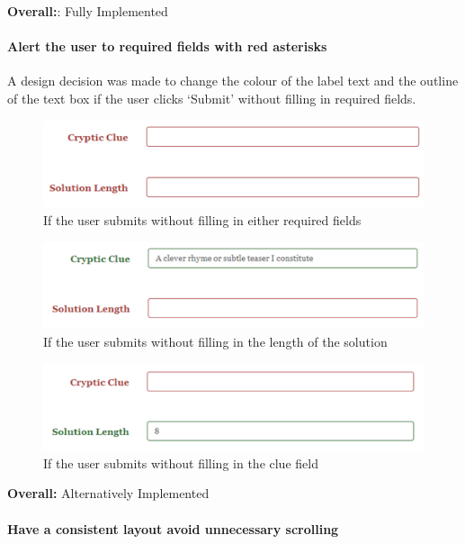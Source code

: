 {\bf Overall:}: Fully Implemented


\paragraph{Alert the user to required fields with red asterisks}    

A design decision was made to change the colour of the label text  and the
outline of the text box if the user clicks `Submit' without filling in  required
fields.

\begin{figure}[H]
	\centering
	\includegraphics[scale=0.8]{evidence/alert1.png}
	\caption{If the user submits without filling in either required fields}
\end{figure}

\begin{figure}[H]
	\centering
	\includegraphics[scale=0.8]{evidence/alert2.png}
	\caption{If the user submits without filling in the length of the solution}
\end{figure}

\begin{figure}[H]
	\centering
	\includegraphics[scale=0.8]{evidence/alert3.png}
	\caption{If the user submits without filling in the clue field}
\end{figure}

{\bf Overall:} Alternatively Implemented


\paragraph{Have a consistent layout avoid unnecessary scrolling}

